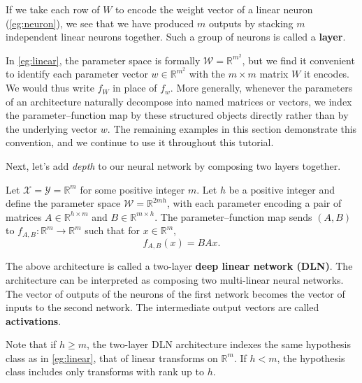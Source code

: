\documentclass[11pt]{article}
\newcommand{\R}{\mathbb{R}}
\newcommand{\X}{\mathcal{X}}
\newcommand{\Y}{\mathcal{Y}}
\newcommand{\W}{\mathcal{W}}
\begin{document}
If we take each row of $W$ to encode the weight vector of a linear neuron
(\cref{eg:neuron}), we see that we have produced $m$ outputs by stacking $m$
independent linear neurons together. Such a group of neurons is called a
\textbf{layer}.

\begin{remark}[Encodings]
    In \cref{eg:linear}, the parameter space is formally $\W = \R^{m^2}$, but
    we find it convenient to identify each parameter vector $w \in \R^{m^2}$
    with the $m \times m$ matrix $W$ it encodes. We would thus write $f_W$ in
    place of $f_w$. More generally, whenever the parameters of an architecture
    naturally decompose into named matrices or vectors, we index the
    parameter--function map by these structured objects directly rather than by
    the underlying vector $w$. The remaining examples in this section
    demonstrate this convention, and we continue to use it throughout this
    tutorial.
\end{remark}

Next, let's add \emph{depth} to our neural network by composing two layers
together.

\begin{example}\label{eg:dln}
    Let $\X = \Y = \R^m$ for some positive integer $m$.
    Let $h$ be a positive integer and define the parameter space $\W =
    \R^{2mh}$, with each parameter encoding a pair of matrices
        $A \in \R^{h \times m}$
    and $B \in \R^{m \times h}$.
    The parameter--function map sends $(A, B)$ to $f_{A,B} : \R^m \to \R^m$
    such that for $x \in \R^m$,
    \begin{equation}
        f_{A,B}(x) = B A x.
    \end{equation}
\end{example}

The above architecture is called a two-layer \textbf{deep linear network
(DLN)}. The architecture can be interpreted as composing two multi-linear
neural networks. The vector of outputs of the neurons of the first network
becomes the vector of inputs to the second network. The intermediate output
vectors are called \textbf{activations}.

Note that if $h \geq m$, the two-layer DLN architecture indexes the same
hypothesis class as in \cref{eg:linear}, that of linear transforms on $\R^m$.
If $h < m$, the hypothesis class includes only transforms with rank up to $h$.
\end{document}
